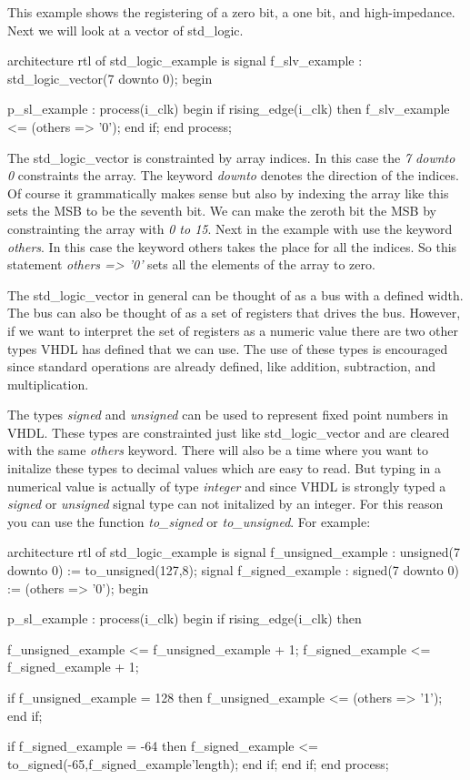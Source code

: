 This example shows the registering of a zero bit, a one bit, and high-impedance. Next we will look at a vector of std\_logic.

\begin{VHDLlisting}[tabsize=8]
architecture rtl of std_logic_example is
	signal f_slv_example  : std_logic_vector(7 downto 0);
begin

p_sl_example : process(i_clk)
begin
	if rising_edge(i_clk) then
		f_slv_example <= (others => '0');
	end if;
end process;
\end{VHDLlisting}

The std\_logic\_vector is constrainted by array indices. In this case the \emph{7 downto 0} constraints the array. The keyword \emph{downto} denotes the direction of the indices. Of course it grammatically makes sense but also by indexing the array like this sets the \ac{MSB} to be the seventh bit. We can make the zeroth bit the \ac{MSB} by constrainting the array with \emph{0 to 15}. Next in the example with use the keyword \emph{others}. In this case the keyword \ac{others} takes the place for all the indices. So this statement \emph{others => '0'} sets all the elements of the array to zero. 
	
The std\_logic\_vector in general can be thought of as a bus with a defined width. The bus can also be thought of as a set of registers that drives the bus. However, if we want to interpret the set of registers as a numeric value there are two other types \ac{VHDL} has defined that we can use. The use of these types is encouraged since standard operations are already defined, like addition, subtraction, and multiplication. 

The types \emph{signed} and \emph{unsigned} can be used to represent fixed point numbers in \ac{VHDL}. These types are constrainted just like std\_logic\_vector and are cleared with the same \emph{others} keyword. There will also be a time where you want to initalize these types to decimal values which are easy to read. But typing in a numerical value is actually of type \emph{integer} and since \ac{VHDL} is strongly typed a \emph{signed} or \emph{unsigned} signal type can not initalized by an integer. For this reason you can use the function \emph{to\_signed} or \emph{to\_unsigned}. For example:

\begin{VHDLlisting}[tabsize=8]
architecture rtl of std_logic_example is
	signal f_unsigned_example : unsigned(7 downto 0) := to_unsigned(127,8);
	signal f_signed_example   : signed(7 downto 0)   := (others => '0');
begin

p_sl_example : process(i_clk)
begin
	if rising_edge(i_clk) then
		
		f_unsigned_example <= f_unsigned_example + 1;
		f_signed_example   <= f_signed_example   + 1;
		
		if f_unsigned_example = 128 then
			f_unsigned_example <= (others => '1');
		end if;
		
		if f_signed_example = -64 then
			f_signed_example <= to_signed(-65,f_signed_example'length);
		end if;		
	end if;
end process;
\end{VHDLlisting}

